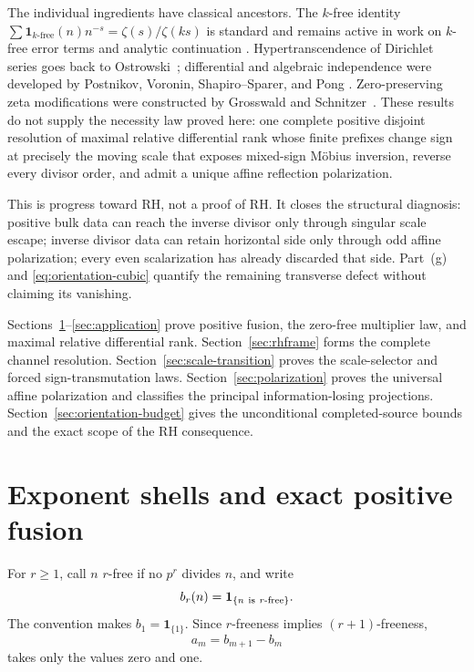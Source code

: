 \documentclass[11pt]{article}
\theoremstyle{definition}
\theoremstyle{remark}
\begin{document}
The individual ingredients have classical ancestors.  The \(k\)-free identity
\(\sum\mathbf1_{k\text{-free}}(n)n^{-s}=\zeta(s)/\zeta(ks)\) is standard and remains active in
work on \(k\)-free error terms and analytic continuation
\cite{Meng2015,Kawalec2026}.  Hypertranscendence of Dirichlet series goes back to
Ostrowski~\cite{Ostrowski1920}; differential and algebraic independence were developed by
Postnikov, Voronin, Shapiro--Sparer, and Pong
\cite{Postnikov1949,Voronin1973,ShapiroSparer1986,Pong2016}.  Zero-preserving zeta modifications were
constructed by Grosswald and Schnitzer~\cite{GrosswaldSchnitzer1978}.  These results do not
supply the necessity law proved here: one complete positive disjoint resolution of maximal
relative differential rank whose finite prefixes change sign at precisely the moving scale that
exposes mixed-sign M\"obius inversion, reverse every divisor order, and admit a unique affine
reflection polarization.

This is progress toward RH, not a proof of RH.  It closes the structural diagnosis: positive
bulk data can reach the inverse divisor only through singular scale escape; inverse divisor data
can retain horizontal side only through odd affine polarization; every even scalarization has
already discarded that side.  Part~\textup{(g)} and \eqref{eq:orientation-cubic} quantify the
remaining transverse defect without claiming its vanishing.

Sections~\ref{sec:shells}--\ref{sec:application} prove positive fusion, the zero-free
multiplier law, and maximal relative differential rank.
Section~\ref{sec:rhframe} forms the complete channel resolution.
Section~\ref{sec:scale-transition} proves the scale-selector and forced sign-transmutation laws.
Section~\ref{sec:polarization} proves the universal affine polarization and classifies the
principal information-losing projections.
Section~\ref{sec:orientation-budget} gives the unconditional completed-source bounds and the
exact scope of the RH consequence.

\section{Exponent shells and exact positive fusion}\label{sec:shells}

For \(r\geq1\), call \(n\) \(r\)-free if no \(p^r\) divides \(n\), and write
\[
 b_r(n)=\mathbf 1_{\{n\ {\rm is}\ r\text{-free}\}}.
\]
The convention makes \(b_1=\mathbf 1_{\{1\}}\).  Since \(r\)-freeness implies
\((r+1)\)-freeness,
\[
 a_m=b_{m+1}-b_m
 \label{eq:shell-difference}
 \tag{2.1}
\]
takes only the values zero and one.
\end{document}
